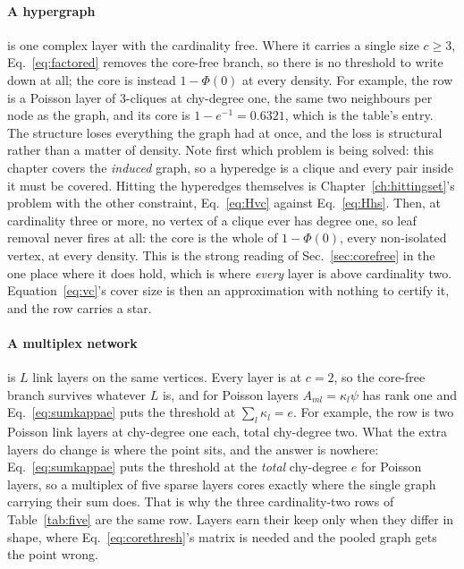 \paragraph{A hypergraph} is one complex layer with the cardinality free. Where
it carries a single size $c\ge3$, Eq.~\eqref{eq:factored} removes the core-free
branch, so there is no threshold
to write down at all; the core is instead $1-\Phi(0)$ at every density. For
example, the row is a Poisson layer of $3$-cliques at chy-degree one, the same
two neighbours per node as the graph, and its core is $1-e^{-1}=0.6321$, which is the table's entry. The
structure loses everything the graph had at once, and the loss is structural
rather than a matter of density. Note first which problem is being solved: this
chapter covers the \emph{induced} graph, so a hyperedge is a clique and every
pair inside it must be covered. Hitting the hyperedges themselves is
Chapter~\ref{ch:hittingset}'s problem with the other constraint,
Eq.~\eqref{eq:Hvc} against Eq.~\eqref{eq:Hhs}. Then, at cardinality three or
more, no vertex of a clique ever has degree one, so leaf removal never fires at
all: the core is the whole of $1-\Phi(0)$, every non-isolated vertex, at every
density. This is the strong reading of Sec.~\ref{sec:corefree} in the one place
where it does hold, which is where \emph{every} layer is above cardinality two.
Equation~\eqref{eq:vc}'s cover size is then an approximation with nothing to
certify it, and the row carries a star.

\paragraph{A multiplex network} is $L$ link layers on the same vertices. Every
layer is at $c=2$, so the core-free branch survives whatever $L$ is, and for
Poisson layers $A_{ml}=\kappa_{l}\psi$ has rank one and
Eq.~\eqref{eq:sumkappae} puts the threshold at $\sum_{l}\kappa_{l}=e$. For
example, the row is two Poisson link layers at chy-degree one each, total
chy-degree two. What the extra
layers do change is where the point sits, and the answer is nowhere:
Eq.~\eqref{eq:sumkappae} puts the threshold at the \emph{total} chy-degree $e$
for Poisson layers, so a multiplex of five sparse layers cores exactly where the
single graph carrying their sum does. That is why the three cardinality-two rows
of Table~\ref{tab:five} are the same row. Layers earn their keep only when they
differ in shape, where Eq.~\eqref{eq:corethresh}'s matrix is needed and the
pooled graph gets the point wrong.

